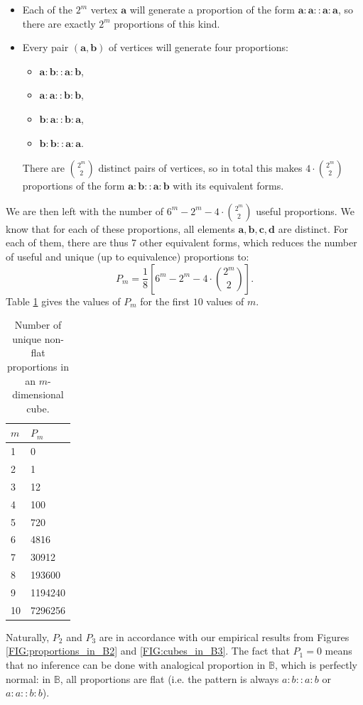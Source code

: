 \begin{itemize}
  \item Each of the $2^m$ vertex $\mathbf{a}$ will generate a proportion of the
    form $\mathbf{a}: \mathbf{a} :: \mathbf{a} : \mathbf{a}$, so there are
    exactly $2^m$ proportions of this kind.
  \item Every pair $(\mathbf{a}, \mathbf{b})$ of vertices will generate four
    proportions:
    \begin{itemize}
      \item $\mathbf{a}: \mathbf{b} :: \mathbf{a} : \mathbf{b}$,
      \item $\mathbf{a}: \mathbf{a} :: \mathbf{b} : \mathbf{b}$,
      \item $\mathbf{b}: \mathbf{a} :: \mathbf{b} : \mathbf{a}$,
      \item $\mathbf{b}: \mathbf{b} :: \mathbf{a} : \mathbf{a}$.
    \end{itemize}
    There are $\binom{2^m}{2}$ distinct pairs of vertices, so in total this
    makes $4\cdot \binom{2^m}{2}$ proportions of the form $\mathbf{a}: \mathbf{b} ::
    \mathbf{a} : \mathbf{b}$ with its equivalent forms.
\end{itemize}

We are then left with the number of $6^m - 2^m - 4\cdot\binom{2^m}{2}$ useful
proportions. We know that for each of these proportions, all elements
$\mathbf{a}, \mathbf{b}, \mathbf{c}, \mathbf{d}$  are distinct. For each of
them, there are thus 7 other equivalent forms, which reduces the number of
useful and unique (up to equivalence) proportions to:
$$P_m = \frac{1}{8} \left[6^m - 2^m - 4\cdot\binom{2^m}{2} \right].$$
Table \ref{TAB:n_params_in_cube} gives the values of $P_m$ for the first $10$
values of $m$.
\begin{table}[h!]
\centering
  \begin{tabular}{ l  l }
\toprule
 $m$ & $P_m$\\
\midrule
    1	&	0\\
    2 &	1\\
    3	&	12\\
    4	&	100\\
    5 &	720\\
    6 &	4816\\
    7 &	30912\\
    8 &	193600\\
    9 & 1194240\\
    10 & 7296256\\
\bottomrule
\end{tabular}
\caption{Number of unique non-flat proportions in an $m$-dimensional cube.}
\label{TAB:n_params_in_cube}
\end{table}
Naturally, $P_2$ and $P_3$ are in accordance with our empirical  results from
Figures \ref{FIG:proportions_in_B2} and \ref{FIG:cubes_in_B3}. The fact that
$P_1 = 0$ means that no inference can be done with analogical proportion in
$\mathbb{B}$, which is perfectly normal: in $\mathbb{B}$, all proportions are
flat (i.e. the pattern is always $a:b::a:b$ or $a:a::b:b$).


